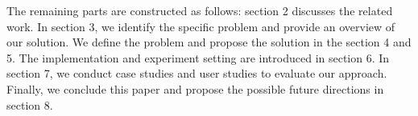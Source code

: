 The remaining parts are constructed as follows: section 2 discusses the related work. In section 3, we identify the specific problem and provide an overview of our solution. We define the problem and propose the solution in the section 4 and 5. The implementation and experiment setting are introduced in section 6. 
In section 7, we conduct case studies and user studies to evaluate our approach. Finally, we conclude this paper and propose the possible future directions in section 8.
